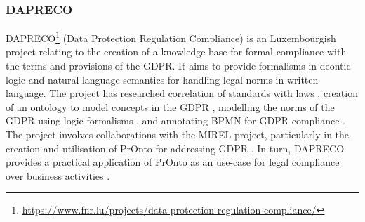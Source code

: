 \subsubsection{DAPRECO}\label{sec:sota:DAPRECO}
DAPRECO\footnote{\url{https://www.fnr.lu/projects/data-protection-regulation-compliance/}} (Data Protection Regulation Compliance) is an Luxembourgish project relating to the creation of a knowledge base for formal compliance with the terms and provisions of the GDPR. It aims to provide formalisms in deontic logic and natural language semantics for handling legal norms in written language. The project has researched correlation of standards with laws \cite{bartolini_towards_2016}, creation of an ontology to model concepts in the GDPR \cite{otake_using_2017}, modelling the norms of the GDPR using logic formalisms \cite{bartolini_legal_2018}, and annotating BPMN for GDPR compliance \cite{bartolini_enhancing_2019}.
The project involves collaborations with the MIREL project, particularly in the creation and utilisation of PrOnto for addressing GDPR \cite{monica_legal_2018,palmirani_pronto_2018,palmirani_pronto_2018-1,bartolini_enhancing_2019}. In turn, DAPRECO provides a practical application of PrOnto as an use-case for legal compliance over business activities \cite{bartolini_enhancing_2019,bartolini_agile_2019}.

